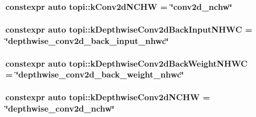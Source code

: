 \subsubsection[{\texorpdfstring{k\+Conv2d\+N\+C\+HW}{kConv2dNCHW}}]{\setlength{\rightskip}{0pt plus 5cm}constexpr auto topi\+::k\+Conv2d\+N\+C\+HW = \char`\"{}conv2d\+\_\+nchw\char`\"{}}\hypertarget{namespacetopi_a8e842c3723b0ad6b2fb82ecb98b8a1c2}{}\label{namespacetopi_a8e842c3723b0ad6b2fb82ecb98b8a1c2}
\subsubsection[{\texorpdfstring{k\+Depthwise\+Conv2d\+Back\+Input\+N\+H\+WC}{kDepthwiseConv2dBackInputNHWC}}]{\setlength{\rightskip}{0pt plus 5cm}constexpr auto topi\+::k\+Depthwise\+Conv2d\+Back\+Input\+N\+H\+WC = \char`\"{}depthwise\+\_\+conv2d\+\_\+back\+\_\+input\+\_\+nhwc\char`\"{}}\hypertarget{namespacetopi_a5c20df4059bd823e003dfede11762473}{}\label{namespacetopi_a5c20df4059bd823e003dfede11762473}
\subsubsection[{\texorpdfstring{k\+Depthwise\+Conv2d\+Back\+Weight\+N\+H\+WC}{kDepthwiseConv2dBackWeightNHWC}}]{\setlength{\rightskip}{0pt plus 5cm}constexpr auto topi\+::k\+Depthwise\+Conv2d\+Back\+Weight\+N\+H\+WC = \char`\"{}depthwise\+\_\+conv2d\+\_\+back\+\_\+weight\+\_\+nhwc\char`\"{}}\hypertarget{namespacetopi_a1676476ab91b608188918f5d267f1d07}{}\label{namespacetopi_a1676476ab91b608188918f5d267f1d07}
\subsubsection[{\texorpdfstring{k\+Depthwise\+Conv2d\+N\+C\+HW}{kDepthwiseConv2dNCHW}}]{\setlength{\rightskip}{0pt plus 5cm}constexpr auto topi\+::k\+Depthwise\+Conv2d\+N\+C\+HW = \char`\"{}depthwise\+\_\+conv2d\+\_\+nchw\char`\"{}}\hypertarget{namespacetopi_a12dcb067885b89c536ae094569e8e3fb}{}\label{namespacetopi_a12dcb067885b89c536ae094569e8e3fb}
